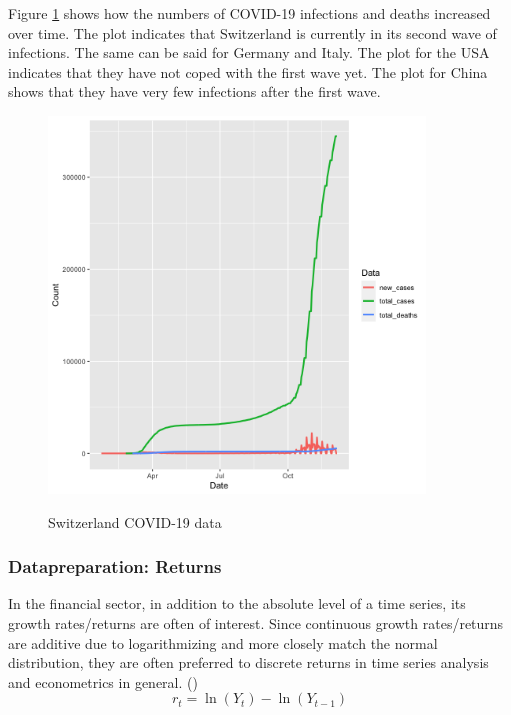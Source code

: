 \documentclass[11pt]{article}
\begin{document}
Figure \ref{switzerland-covid-numbers} shows how the numbers of COVID-19 infections and deaths increased over time. The plot indicates that Switzerland is currently in its second wave of infections. The same can be said for Germany and Italy. The plot for the USA indicates that they have not coped with the first wave yet. The plot for China shows that they have very few infections after the first wave.

\begin{figure}[!h]
\centering
\includegraphics[width=100mm]{R-Code/plots/switzerlandCovid.png} \\
\caption{Switzerland COVID-19 data}
\label{switzerland-covid-numbers}
\end{figure}




\subsubsection{Datapreparation: Returns}
In the financial sector, in addition to the absolute level of a time series, its growth rates/returns are often of interest.
Since continuous growth rates/returns are additive due to logarithmizing and more closely match the normal distribution, they are often preferred to discrete returns in time series analysis and econometrics in general. (\cite{PowerPoi49:online})
$$r_{t} =\ln \left(Y_{t}\right)-\ln \left(Y_{t-1}\right)$$
\end{document}
